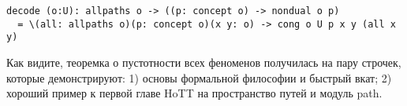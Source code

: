 \begin{lstlisting}
decode (o:U): allpaths o -> ((p: concept o) -> nondual o p)
  = \(all: allpaths o)(p: concept o)(x y: o) -> cong o U p x y (all x y)
\end{lstlisting}

Как видите, теоремка о пустотности всех феноменов получилась на пару
строчек, которые демонстрируют: 1) основы формальной философии и быстрый вкат;
2) хороший пример к первой главе HoTT на пространство путей и модуль path.

\embedbib
